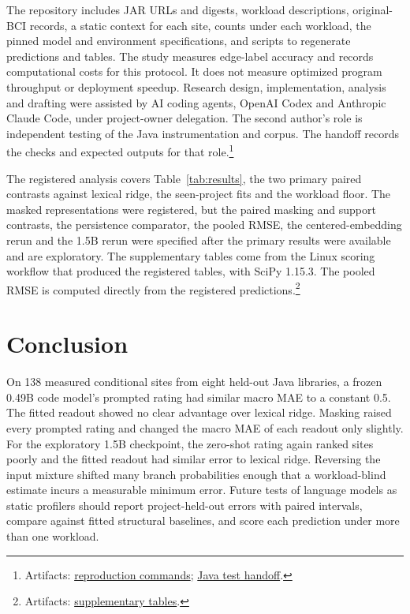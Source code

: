 \documentclass[11pt]{article}
\newcommand{\repocommit}{81d03caebe268d013b3163bcbff31cadabaaec21}
\newcommand{\repourl}{https://github.com/minggu151623/llm_profiling_research}
\newcommand{\repo}[2]{\href{\repourl/blob/\repocommit/#1}{#2}}
\newcommand{\artifacts}[1]{\footnote{Artifacts: #1.}}
\begin{document}
The repository includes JAR URLs and digests, workload descriptions, original-BCI records, a static context for each site, counts under each workload, the pinned model and environment specifications, and scripts to regenerate predictions and tables. The study measures edge-label accuracy and records computational costs for this protocol. It does not measure optimized program throughput or deployment speedup. Research design, implementation, analysis and drafting were assisted by AI coding agents, OpenAI Codex and Anthropic Claude Code, under project-owner delegation. The second author's role is independent testing of the Java instrumentation and corpus. The handoff records the checks and expected outputs for that role.\artifacts{\repo{experiments/study/README.md}{reproduction commands}; \repo{java/TESTING.md}{Java test handoff}}

The registered analysis covers Table~\ref{tab:results}, the two primary paired contrasts against lexical ridge, the seen-project fits and the workload floor. The masked representations were registered, but the paired masking and support contrasts, the persistence comparator, the pooled RMSE, the centered-embedding rerun and the 1.5B rerun were specified after the primary results were available and are exploratory. The supplementary tables come from the Linux scoring workflow that produced the registered tables, with SciPy 1.15.3. The pooled RMSE is computed directly from the registered predictions.\artifacts{\repo{experiments/study/supplement}{supplementary tables}}

\section{Conclusion}

On 138 measured conditional sites from eight held-out Java libraries, a frozen 0.49B code model's prompted rating had similar macro MAE to a constant 0.5. The fitted readout showed no clear advantage over lexical ridge. Masking raised every prompted rating and changed the macro MAE of each readout only slightly. For the exploratory 1.5B checkpoint, the zero-shot rating again ranked sites poorly and the fitted readout had similar error to lexical ridge. Reversing the input mixture shifted many branch probabilities enough that a workload-blind estimate incurs a measurable minimum error. Future tests of language models as static profilers should report project-held-out errors with paired intervals, compare against fitted structural baselines, and score each prediction under more than one workload.



\end{document}
